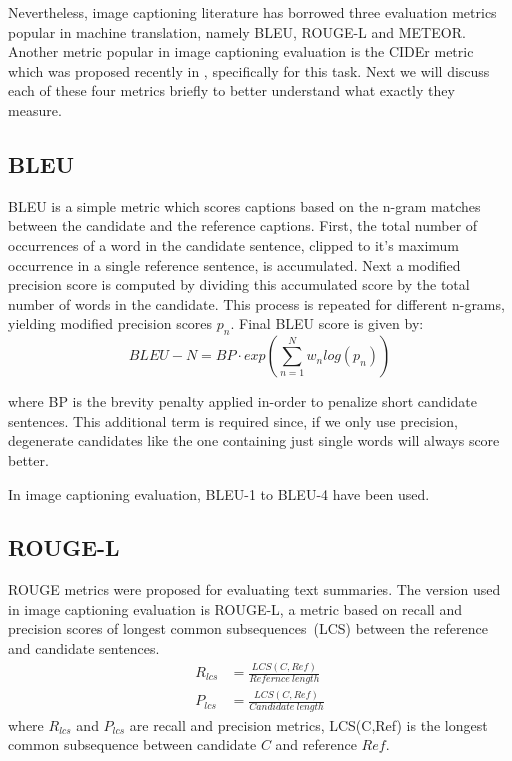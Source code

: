 Nevertheless, image captioning literature has borrowed three evaluation metrics
popular in machine translation, namely BLEU\cite{Papineni:BLEU},
ROUGE-L\cite{lin2004rouge} and METEOR\cite{denkowski-lavie:2014:Meteor}. 
Another metric popular in image captioning evaluation is the CIDEr metric which
was proposed recently in \cite{Vedantam_2015_CVPR}, specifically for this task. 
Next we will discuss each of these four metrics briefly to better understand
what exactly they measure.

\subsection{BLEU}

BLEU is a simple metric which scores captions based on the n-gram matches
between the candidate and the reference captions.
First, the total number of occurrences of a word in the candidate sentence,
clipped to it's maximum occurrence in a single reference sentence, is
accumulated.
Next a modified precision score is computed by dividing this accumulated score
by the total number of words in the candidate.
This process is repeated for different n-grams, yielding modified precision
scores $p_n$. 
Final BLEU score is given by:
\begin{equation}
    BLEU-N = BP\cdot{}exp(\sum_{n=1}^{N}w_{n}log(p_n))        
\end{equation}

\noindent where BP is the brevity penalty applied in-order to penalize 
short candidate sentences.
This additional term is required since, if we only use precision, degenerate
candidates like the one containing just single words will always score better.

In image captioning evaluation, BLEU-1 to BLEU-4 have been used. 
\subsection{ROUGE-L}
ROUGE metrics were proposed for evaluating text summaries.
The version used in image captioning evaluation is ROUGE-L, a metric based on
recall and precision scores of longest common subsequences~(LCS) between the reference
and candidate sentences.
\begin{align}
        R_{lcs} &= \frac{LCS(C,Ref)}{Refernce\ length}\\[0.75ex]
        P_{lcs} &= \frac{LCS(C,Ref)}{Candidate\ length}
\end{align}
\noindent where $R_{lcs}$ and $P_{lcs}$ are recall and precision metrics,
LCS(C,Ref) is the longest common subsequence between candidate $C$ and reference
$Ref$. 

